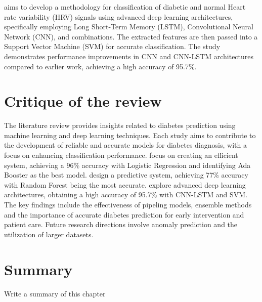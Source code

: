 \cite{swapna2018diabetes} aims to develop a methodology for classification of diabetic and normal Heart rate variability (HRV) signals using advanced deep learning architectures, specifically employing Long Short-Term Memory (LSTM), Convolutional Neural Network (CNN), and combinations. The extracted features are then passed into a Support Vector Machine (SVM) for accurate classification. The study demonstrates performance improvements in CNN and CNN-LSTM architectures compared to earlier work, achieving a high accuracy of 95.7\%. 

\section{Critique of the review} %
The literature review provides insights related to diabetes prediction using machine learning and deep learning techniques. Each study aims to contribute to the development of reliable and accurate models for diabetes diagnosis, with a focus on enhancing classification performance. \cite{mujumdar2019diabetes} focus on creating an efficient system, achieving a 96\% accuracy with Logistic Regression and identifying Ada Booster as the best model. \cite{soni2020diabetes} design a predictive system, achieving 77\% accuracy with Random Forest being the most accurate. \cite{swapna2018diabetes} explore advanced deep learning architectures, obtaining a high accuracy of 95.7\% with CNN-LSTM and SVM. The key findings include the effectiveness of pipeling models, ensemble methods and the importance of accurate diabetes prediction for early intervention and patient care. Future research directions involve anomaly prediction and the utilization of larger datasets.
~\\

\section{Summary} 
Write a summary of this chapter~\\
